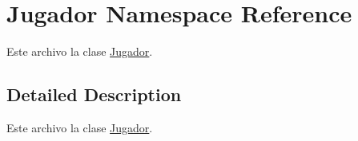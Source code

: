 \hypertarget{namespace_jugador}{\section{Jugador Namespace Reference}
\label{namespace_jugador}
}


Este archivo la clase \hyperlink{namespace_jugador}{Jugador}.  




\subsection{Detailed Description}
Este archivo la clase \hyperlink{namespace_jugador}{Jugador}. 